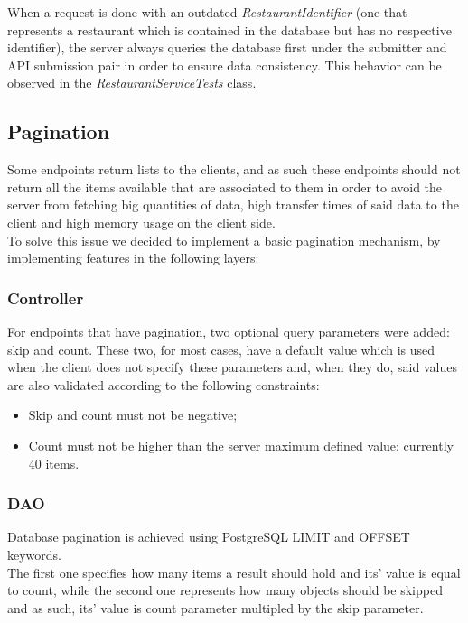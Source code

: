 When a request is done with an outdated \textit{RestaurantIdentifier} (one that represents a restaurant which is contained in the database but has no respective
identifier), the server always queries the database first under the submitter and API submission pair in order to ensure data consistency. This behavior
can be observed in the \textit{RestaurantServiceTests} class.

\subsection{Pagination}

Some endpoints return lists to the clients, and as such these endpoints should not return all the items available that are associated
to them in order to avoid the server from fetching big quantities of data, high transfer times of said data to the client and 
high memory usage on the client side.\\

To solve this issue we decided to implement a basic pagination mechanism, by implementing features in the following layers:\\

\subsubsection{Controller}

For endpoints that have pagination, two optional query parameters were added: skip and count. These two, for most cases, have a
default value which is used when the client does not specify these parameters and, when they do, said values are also validated 
according to the following constraints:
\begin{itemize}
    \item Skip and count must not be negative;
    \item Count must not be higher than the server maximum defined value: currently 40 items.
\end{itemize}

\subsubsection{DAO}

Database pagination is achieved using PostgreSQL LIMIT and OFFSET keywords.\\

The first one specifies how many items a result should hold and its' value is equal to count,
while the second one represents how many objects should be skipped and as such, its' value is count
parameter multipled by the skip parameter.\\

